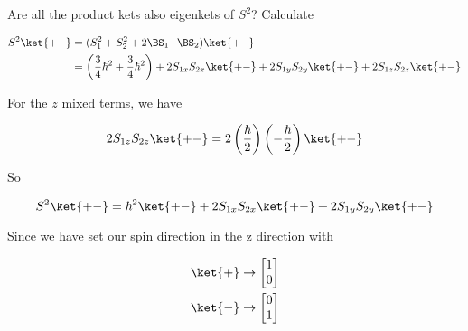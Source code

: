 Are all the product kets also eigenkets of $S^2$?  Calculate

\begin{align*}
S^2 \ket{+-} 
&= 
(S_1^2 + S_2^2 + 2 \BS_1 \cdot \BS_2) \ket{+-} \\
&=
\left(\frac{3}{4}\hbar^2
+\frac{3}{4}\hbar^2\right)
+ 2 S_{1x} S_{2x} \ket{+-} 
+ 2 S_{1y} S_{2y} \ket{+-} 
+ 2 S_{1z} S_{2z} \ket{+-} 
\end{align*}

For the $z$ mixed terms, we have

\begin{equation}\label{eqn:qmTwoL16:370}
2 S_{1z} S_{2z} \ket{+-}  = 
2 
\left(\frac{\hbar}{2}\right)
\left(-\frac{\hbar}{2}\right)
\ket{+-}
\end{equation}

So

\begin{equation}\label{eqn:qmTwoL16:390}
S^2\ket{+-} = 
\hbar^2 \ket{+-} 
+ 2 S_{1x} S_{2x} \ket{+-} 
+ 2 S_{1y} S_{2y} \ket{+-} 
\end{equation}

Since we have set our spin direction in the z direction with

\begin{align}\label{eqn:qmTwoL16:410}
\ket{+} &\rightarrow 
\begin{bmatrix}
1 \\
0
\end{bmatrix} \\
\ket{-} &\rightarrow 
\begin{bmatrix}
0 \\
1 
\end{bmatrix}
\end{align}

